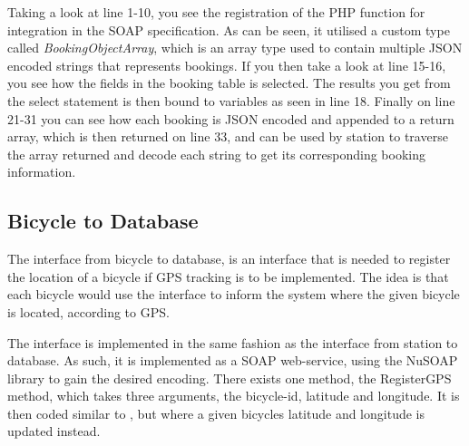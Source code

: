 Taking a look at line 1-10, you see the registration of the PHP function for integration in the SOAP specification.
As can be seen, it utilised a custom type called \textit{BookingObjectArray}, which is an array type used to contain multiple JSON encoded strings that represents bookings.
If you then take a look at line 15-16, you see how the fields in the booking table is selected.
The results you get from the select statement is then bound to variables as seen in line 18.
Finally on line 21-31 you can see how each booking is JSON encoded and appended to a return array, which is then returned on line 33, and can be used by station to traverse the array returned and decode each string to get its corresponding booking information.

\subsection{Bicycle to Database}
The interface from bicycle to database, is an interface that is needed to register the location of a bicycle if GPS tracking is to be implemented.
The idea is that each bicycle would use the interface to inform the system where the given bicycle is located, according to GPS.

The interface is implemented in the same fashion as the interface from station to database.
As such, it is implemented as a SOAP web-service, using the NuSOAP library to gain the desired encoding.
There exists one method, the RegisterGPS method, which takes three arguments, the bicycle-id, latitude and longitude.
It is then coded similar to , but where a given bicycles latitude and longitude is updated instead.

